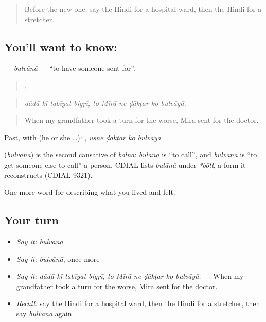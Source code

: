 \label{lesson:HI-C491-bulvana}



\begin{quote}
Before the new one: say the Hindi for a hospital ward, then the Hindi for a stretcher.
\end{quote}

\subsection*{You'll want to know: }
\textbf{} — \emph{bulvānā} — \textquotedblleft{}to have someone sent for\textquotedblright{}.

\begin{quote}
   ,      
\end{quote}

\begin{quote}
\emph{dādā kī tabīyat bigṛī, to Mīrā ne ḍākṭar ko bulvāyā.}
\end{quote}

\begin{quote}
When my grandfather took a turn for the worse, Mira sent for the doctor.
\end{quote}

Past, with  (he or she …):    , \emph{usne ḍākṭar ko bulvāyā}.

\begin{cousinweb}
\textbf{} (\emph{bulvānā}) is the second causative of \emph{bolnā}: \emph{bulānā} is \textquotedblleft{}to call\textquotedblright{}, and \emph{bulvānā} is \textquotedblleft{}to get someone else to call\textquotedblright{} a person. CDIAL lists \emph{bulānā} under \emph{*bōll}, a form it reconstructs (CDIAL 9321).
\end{cousinweb}

\begin{grammarlens}[title={What you've built}]
One more word for describing what you lived and felt.
\end{grammarlens}

\subsection*{Your turn}
\begin{itemize}
\raggedright
  \item \emph{Say it:} \emph{bulvānā}
  \item \emph{Say it:} \emph{bulvānā}, once more
  \item \emph{Say it:} \emph{dādā kī tabīyat bigṛī, to Mīrā ne ḍākṭar ko bulvāyā.} — When my grandfather took a turn for the worse, Mira sent for the doctor.
  \item \emph{Recall:} say the Hindi for a hospital ward, then the Hindi for a stretcher, then say \emph{bulvānā} again
\end{itemize}

